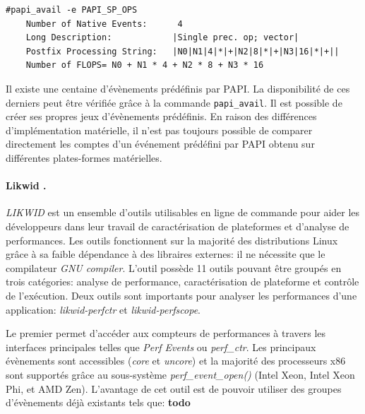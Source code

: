 \begin{verbatim}
#papi_avail -e PAPI_SP_OPS
    Number of Native Events:      4
    Long Description:            |Single prec. op; vector|
    Postfix Processing String:   |N0|N1|4|*|+|N2|8|*|+|N3|16|*|+||
    Number of FLOPS= N0 + N1 * 4 + N2 * 8 + N3 * 16
\end{verbatim}

            Il existe une centaine d'évènements prédéfinis par PAPI. La disponibilité de ces derniers peut être vérifiée grâce à la commande \verb|papi_avail|. Il est possible de créer ses propres jeux d'évènements prédéfinis. En raison des différences d'implémentation matérielle, il n'est pas toujours possible de comparer directement les comptes d'un événement prédéfini par PAPI obtenu sur différentes plates-formes matérielles.

        \paragraph{Likwid \cite{Treibig2010}.} \label{sec:edl_profiling_likwid}
        
            \textit{LIKWID} est un ensemble d'outils utilisables en ligne de commande pour aider les développeurs dans leur travail de caractérisation de plateformes et d'analyse de performances. Les outils fonctionnent sur la majorité des distributions Linux grâce à sa faible dépendance à des libraires externes: il ne nécessite que le compilateur \textit{GNU compiler}. L'outil possède 11 outils pouvant être groupés en trois catégories: analyse de performance, caractérisation de plateforme et contrôle de l'exécution. Deux outils sont importants pour analyser les performances d'une application: \textit{likwid-perfctr} et \textit{likwid-perfscope}.
        
            Le premier permet d'accéder aux compteurs de performances à travers les interfaces principales telles que \textit{Perf Events} ou \textit{perf\_ctr}. Les principaux évènements sont accessibles (\textit{core} et \textit{uncore}) et la majorité des processeurs x86 sont supportés grâce au sous-système \textit{perf\_event\_open()} (Intel Xeon, Intel Xeon Phi, et AMD Zen). L'avantage de cet outil est de pouvoir utiliser des groupes d'évènements déjà existants tels que:
\textbf{todo}

